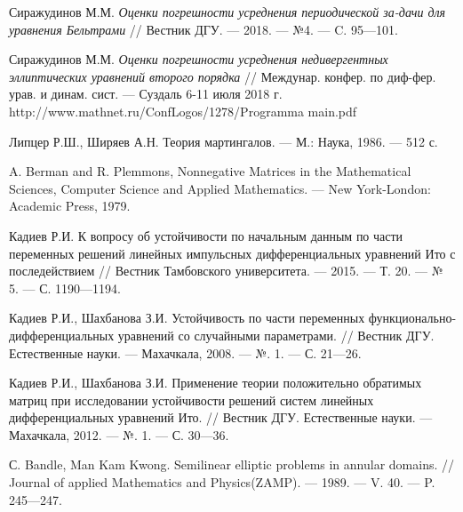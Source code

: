 \begin{thebibliography}{111}
Сиражудинов М.М. \emph{Оценки погрешности усреднения периодической за-дачи для уравнения Бельтрами} // Вестник ДГУ. --- 2018. --- №4. --- C. 95---101.



Сиражудинов М.М. \emph{Оценки погрешности усреднения недивергентных эллиптических уравнений второго порядка} // Междунар. конфер. по диф-фер. урав. и динам. сист. --- Суздаль 6-11 июля 2018 г. http://www.mathnet.ru/ConfLogos/1278/Programma main.pdf






	

	Липцер Р.Ш., Ширяев А.Н. Теория мартингалов. --- М.: Наука, 1986. --- 512 с.
	
	

	A. Berman and R. Plemmons, Nonnegative Matrices in the Mathematical Sciences, Computer Science and Applied Mathematics. --- New York-London: Academic Press, 1979.
	
	

	Кадиев Р.И. К вопросу об устойчивости по начальным данным по части переменных решений линейных импульсных	дифференциальных уравнений Ито с последействием // Вестник Тамбовского университета. --- 2015. --- Т. 20. --- № 5. --- С. 1190---1194.
	
	

	Кадиев Р.И., Шахбанова З.И. Устойчивость по части переменных функционально-дифференциальных уравнений со случайными параметрами. // Вестник ДГУ. Естественные науки. ---  Махачкала, 2008. --- №. 1. --- С. 21---26.
	
	

	Кадиев Р.И., Шахбанова З.И. Применение теории положительно обратимых матриц при исследовании устойчивости решений
	систем линейных дифференциальных уравнений Ито. // Вестник ДГУ. Естественные науки. --- Махачкала, 2012. --- №. 1. --- С. 30---36.














С. Bandle, Man Kam Kwong. Semilinear elliptic problems in annular domains. // Journal of applied Mathematics and Physics(ZAMP). --- 1989. --- V. 40. --- P. 245---247.



\end{thebibliography}
